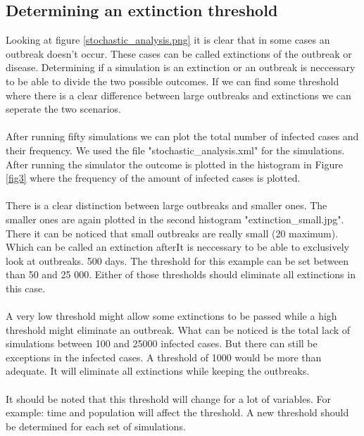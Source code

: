 \documentclass[runningheads]{llncs}
\begin{document}
	\subsection{Determining an extinction threshold}
	Looking at figure \ref{stochastic_analysis.png} it is clear that in some cases an outbreak doesn't occur. These cases can be called extinctions of the outbreak or disease. Determining if a simulation is an extinction or an outbreak is neccessary to be able to divide the two possible outcomes. If we can find some threshold where there is a clear difference between large outbreaks and extinctions we can seperate the two scenarios.\\ \\
	After running fifty simulations we can plot the total number of infected cases and their frequency.  We used the file "stochastic\_analysis.xml" for the simulations. After running the simulator the outcome is plotted in the histogram in Figure \ref{fig3} where the frequency of the amount of infected cases is plotted.\\ \\
	There is a clear distinction between large outbreaks and smaller ones. The smaller ones are again plotted in the second histogram "extinction\_small.jpg". There it can be noticed that small outbreaks are really small (20 maximum). Which can be called an extinction afterIt is neccessary to be able to exclusively look at outbreaks.  500 days. The threshold for this example can be set between than 50 and 25 000. Either of those thresholds should eliminate all extinctions in this case.\\ \\
	A very low threshold might allow some extinctions to be passed while a high threshold might eliminate an outbreak. What can be noticed is the total lack of simulations between 100 and 25000 infected cases. But there can still be exceptions in the infected cases. A threshold of 1000 would be more than adequate. It will eliminate all extinctions while keeping the outbreaks.\\ \\
	It should be noted that this threshold will change for a lot of variables. For example: time and population will affect the threshold. A new threshold should be determined for each set of simulations.
	
\end{document}
